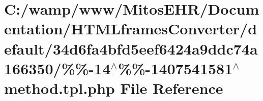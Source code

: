 \hypertarget{default_234d6fa4bfd5eef6424a9ddc74a166350_2_06_06-14_05_06_06-1407541581_05method_8tpl_8php}{\section{\-C\-:/wamp/www/\-Mitos\-E\-H\-R/\-Documentation/\-H\-T\-M\-Lframes\-Converter/default/34d6fa4bfd5eef6424a9ddc74a166350/\%\%-\/14$^\wedge$\%\%-\/1407541581$^\wedge$method.tpl.\-php \-File \-Reference}
\label{default_234d6fa4bfd5eef6424a9ddc74a166350_2_06_06-14_05_06_06-1407541581_05method_8tpl_8php}
}
